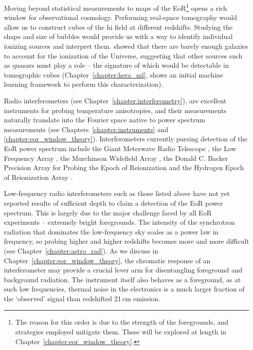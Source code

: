 Moving beyond statistical measurements to maps of the EoR\footnote{The reason for this order is due to the strength of the foregrounds, and strategies employed mitigate them. These will be explored at length in Chapter~\ref{chapter:eor_window_theory}.} opens a rich window for observational cosmology. Performing real-space tomography would allow us to construct cubes of the {\sc hi} field at different redshifts. Studying the shape and size of bubbles would provide us with a way to identify individual ionizing sources and interpret them. \cite{Robertson.15} showed that there are barely enough galaxies to account for the ionization of the Universe, suggesting that other sources such as quasars must play a role -- the signature of which would be detectable in tomographic cubes (Chapter~\ref{chapter:hera_ml}, shows an initial machine learning framework to perform this characterization). %

Radio interferometers (see Chapter~\ref{chapter:interferometry}), are excellent instruments for probing temperature anisotropies, and their measurements naturally translate into the Fourier space native to power spectrum measurements (see Chapters~\ref{chapter:instruments} and \ref{chapter:eor_window_theory}). Interferometers currently pursing detection of the EoR power spectrum include the Giant Meterwave Radio Telescope \citep[GMRT;][]{Paciga.13}, the Low Frequency Array \citep[LOFAR;][]{vanHaarlem.13}, the Murchinson Widefield Array \citep[MWA;][]{Tingay.13}, the Donald C. Backer Precision Array for Probing the Epoch of Reionization \citep[PAPER;][]{Parsons.10} and the Hydrogen Epoch of Reionization Array \citep{deBoer.17}.

Low-frequency radio interferometers such as those listed above have not yet reported results of sufficient depth to claim a detection of the EoR power spectrum. This is largely due to the major challenge faced by all EoR experiments -- extremely bright foregrounds. The intensity of the synchrotron radiation that dominates the low-frequency sky scales as a power law in frequency, so probing higher and higher redshifts becomes more and more difficult (see Chapter~\ref{chapter:astro_rad}). As we discuss in Chapter~\ref{chapter:eor_window_theory}, the chromatic response of an interferometer may provide a crucial lever arm for disentangling foreground and background radiation. The instrument itself also behaves as a foreground, as at such low frequencies, thermal noise in the electronics is a much larger fraction of the `observed' signal than redshifted 21\,cm emission.

